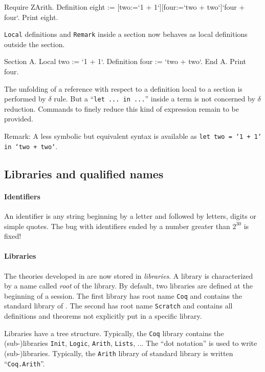 \documentclass[11pt]{article}
\begin{document}
\begin{coq_example}
Require ZArith.
Definition eight := [two:=`1 + 1`][four:=`two + two`]`four + four`. 
Print eight.
\end{coq_example}

{\tt Local} definitions and {\tt Remark} inside a section now behaves
as local definitions outside the section.

\begin{coq_example}
Section A.
Local two := `1 + 1`.
Definition four := `two + two`.
End A.
Print four.
\end{coq_example}

The unfolding of a reference with respect to a definition local to a section
is performed by $\delta$ rule. But a ``{\tt let ... in ...}'' inside a term
is not concerned by $\delta$ reduction. Commands to finely reduce this
kind of expression remain to be provided.
\medskip

Remark: A less symbolic but equivalent syntax is available as {\tt let
two = `1 + 1` in `two + two`}.

\subsection{Libraries and qualified names}
\label{Names}

\paragraph{Identifiers} An identifier is any string beginning by a
letter and followed by letters, digits or simple quotes. The bug
with identifiers ended by a number greater than $2^{30}$ is fixed!

\paragraph{Libraries}

The theories developed in {\Coq} are now stored in {\it libraries}.  A
library is characterized by a name called {\it root} of the
library. By default, two libraries are defined at the beginning of a
{\Coq} session. The first library has root name {\tt Coq} and contains the
standard library of \Coq. The second has root name {\tt Scratch} and
contains all definitions and theorems not explicitly put in a specific
library. 

Libraries have a tree structure. Typically, the {\tt Coq} library
contains the (sub-)libraries {\tt Init}, {\tt Logic}, {\tt Arith},
{\tt Lists}, ... The ``dot notation'' is used to write
(sub-)libraries. Typically, the {\tt Arith} library of {\Coq} standard
library is written ``{\tt Coq.Arith}''.
\end{document}
